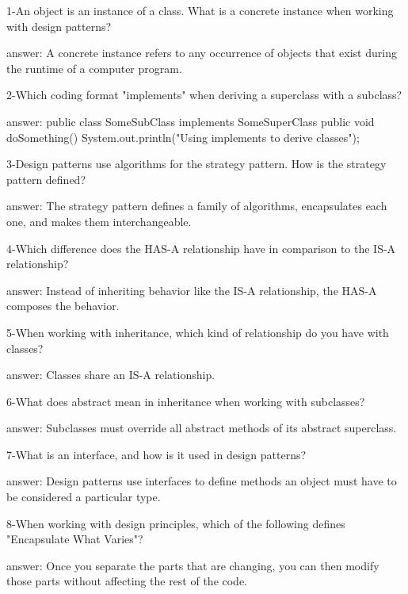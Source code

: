 1-An object is an instance of a class. What is a concrete instance when working with design patterns?


answer: A concrete instance refers to any occurrence of objects that exist during the runtime of a computer program.

2-Which coding format "implements" when deriving a superclass with a subclass?


answer: 
public class SomeSubClass implements SomeSuperClass {
   public void doSomething() {     System.out.println("Using implements to derive classes");
   }
}

3-Design patterns use algorithms for the strategy pattern. How is the strategy pattern defined?

answer: The strategy pattern defines a family of algorithms, encapsulates each one, and makes them interchangeable.

4-Which difference does the HAS-A relationship have in comparison to the IS-A relationship?

answer: Instead of inheriting behavior like the IS-A relationship, the HAS-A composes the behavior.

5-When working with inheritance, which kind of relationship do you have with classes?

answer: Classes share an IS-A relationship.

6-What does abstract mean in inheritance when working with subclasses?

answer: Subclasses must override all abstract methods of its abstract superclass.

7-What is an interface, and how is it used in design patterns?

answer: Design patterns use interfaces to define methods an object must have to be considered a particular type.

8-When working with design principles, which of the following defines "Encapsulate What Varies"?

answer: Once you separate the parts that are changing, you can then modify those parts without affecting the rest of the code.
